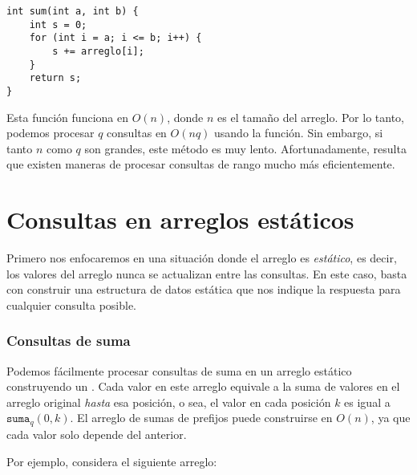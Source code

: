 \begin{lstlisting}
int sum(int a, int b) {
    int s = 0;
    for (int i = a; i <= b; i++) {
        s += arreglo[i];
    }
    return s;
}
\end{lstlisting}

Esta función funciona en $O(n)$,
donde $n$ es el tamaño del arreglo.
Por lo tanto, podemos procesar $q$ consultas en $O(nq)$
usando la función.
Sin embargo, si tanto $n$ como $q$ son grandes, este método
es muy lento. Afortunadamente, resulta que existen
maneras de procesar consultas de rango mucho más eficientemente.

\section{Consultas en arreglos estáticos}

Primero nos enfocaremos en una situación donde
el arreglo es \emph{estático}, es decir,
los valores del arreglo nunca se actualizan entre las consultas.
En este caso, basta con construir
una estructura de datos estática que nos indique
la respuesta para cualquier consulta posible.

\subsubsection{Consultas de suma}


Podemos fácilmente procesar consultas de suma en un arreglo estático
construyendo un .
Cada valor en este arreglo equivale a la suma de valores en el
arreglo original \emph{hasta} esa posición, o sea, el valor en
cada posición $k$ es igual a $\texttt{suma}_q(0,k)$.
El arreglo de sumas de prefijos puede construirse en $O(n)$,
ya que cada valor solo depende del anterior.

Por ejemplo, considera el siguiente arreglo:

\begin{center}
\end{center}

